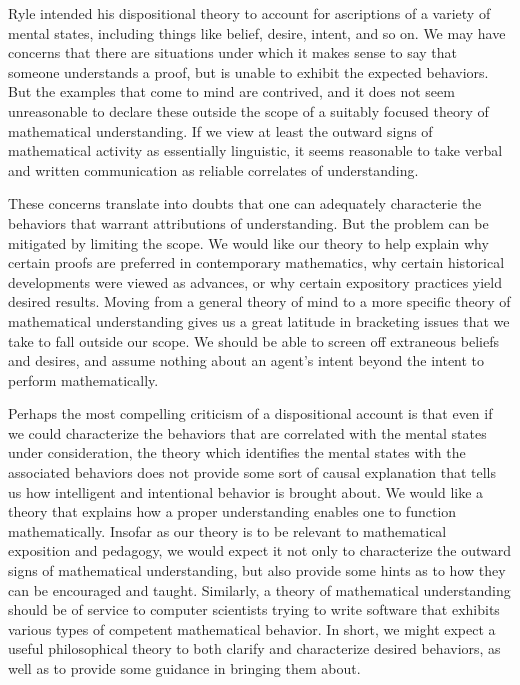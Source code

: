 \documentclass{article}
\begin{document}
Ryle intended his dispositional theory to account for ascriptions of a variety
of mental states, including things like belief, desire, intent, and so on.
We may have concerns that there are situations under which it makes sense
to say that someone understands a proof, but is unable to exhibit the expected
behaviors. But the examples that come to mind are contrived, and it does not
seem unreasonable to declare these outside the scope of a suitably focused
theory of mathematical understanding. If we view at least the outward signs of
mathematical activity as essentially linguistic, it seems reasonable to take
verbal and written communication as reliable correlates of understanding.

These concerns translate into doubts that one can adequately characterie the
behaviors that warrant attributions of understanding. But the problem can be
mitigated by limiting the scope. We would like our theory to help explain why
certain proofs are preferred in contemporary mathematics, why certain historical
developments were viewed as advances, or why certain expository practices yield
desired results. Moving from a general theory of mind to a more specific
theory of mathematical understanding gives us a great latitude in bracketing
issues that we take to fall outside our scope. We should be able to screen off
extraneous beliefs and desires, and assume nothing about an agent's intent
beyond the intent to perform mathematically.

Perhaps the most compelling criticism of a dispositional account is that even
if we could characterize the behaviors that are correlated with the mental states
under consideration, 
the theory which identifies the mental states with the associated behaviors
does not provide some sort of causal explanation that tells us how intelligent
and intentional behavior is brought about. We would like a theory that explains
how a proper understanding enables one to function mathematically. Insofar as
our theory is to be relevant to mathematical exposition and pedagogy, we would
expect it not only to characterize the outward signs of mathematical 
understanding, but also provide some hints as to how they can be encouraged and
taught. Similarly, a theory of mathematical understanding should be of service 
to computer scientists trying to write software that exhibits various types of
competent mathematical behavior. In short, we might expect a useful 
philosophical theory to both clarify and characterize desired behaviors, as well
as to provide some guidance in bringing them about.
\end{document}
